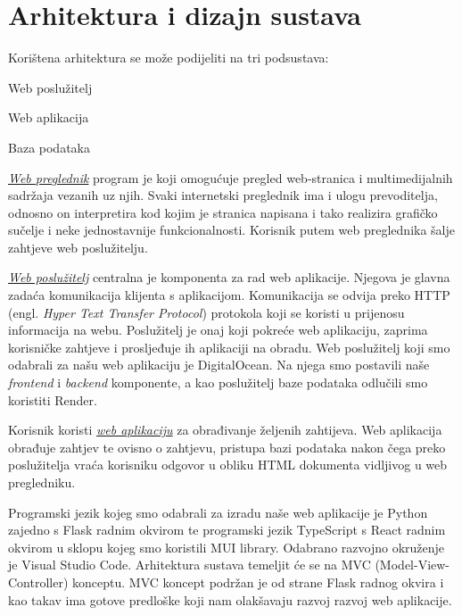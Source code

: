 \chapter{Arhitektura i dizajn sustava}
		
		Korištena arhitektura se može podijeliti na tri podsustava:
		    \begin{packed_item}
		        \item Web poslužitelj
    		    \item Web aplikacija
    		    \item Baza podataka
		    \end{packed_item}
		    
	    \underline{\textit{Web preglednik}} program je koji omogućuje pregled web-stranica i multimedijalnih sadržaja vezanih uz njih. Svaki internetski preglednik ima i ulogu prevoditelja, odnosno on interpretira kod kojim je stranica napisana i tako realizira grafičko sučelje i neke jednostavnije funkcionalnosti. Korisnik putem web preglednika šalje zahtjeve web poslužitelju.
	    
	    \underline{\textit{Web poslužitelj}} centralna je komponenta za rad web aplikacije. Njegova je glavna zadaća komunikacija klijenta s aplikacijom. Komunikacija se odvija preko HTTP (engl. \textit{Hyper Text Transfer Protocol}) protokola koji se koristi u prijenosu informacija na webu. Poslužitelj je onaj koji pokreće web aplikaciju, zaprima korisničke zahtjeve i prosljeđuje ih aplikaciji na obradu. Web poslužitelj koji smo odabrali za našu web aplikaciju je DigitalOcean. Na njega smo postavili naše \textit{frontend} i \textit{backend} komponente, a kao poslužitelj baze podataka odlučili smo koristiti Render.

	    Korisnik koristi \underline{\textit{web aplikaciju}} za obrađivanje željenih zahtijeva. Web aplikacija obrađuje zahtjev te ovisno o zahtjevu, pristupa bazi podataka nakon čega preko poslužitelja vraća korisniku odgovor u obliku HTML dokumenta vidljivog u web pregledniku.
		
		Programski jezik kojeg smo odabrali za izradu naše web aplikacije je Python zajedno s Flask radnim okvirom te programski jezik TypeScript s React radnim okvirom u sklopu kojeg smo koristili MUI library. Odabrano razvojno okruženje je Visual Studio Code. Arhitektura sustava temeljit će se na MVC (Model-View-Controller) konceptu. MVC koncept podržan je od strane Flask radnog okvira i kao takav ima gotove predloške koji nam olakšavaju razvoj razvoj web aplikacije.
		
